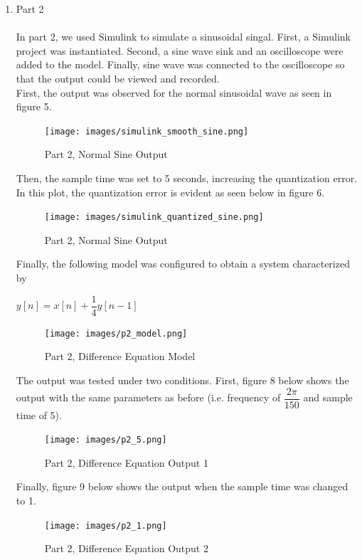\documentclass{article}
\begin{document}
\begin{enumerate}
\item Part 2 \\ \\
In part 2, we used Simulink to simulate a sinusoidal singal. First, a Simulink project was instantiated. Second, a sine wave sink and an oscilloscope were added to the model.  Finally, sine wave was connected to the oscilloscope so that the output could be viewed and recorded. \\
First, the output was observed for the normal sinusoidal wave as seen in figure 5.
\begin{figure}[H]
    \begin{center}
        \texttt{[image: images/simulink\_smooth\_sine.png]}
            \caption{Part 2, Normal Sine Output}
        \end{center}
    \end{figure}
Then, the sample time was set to 5 seconds, increasing the quantization error. In this plot, the quantization error is evident as seen below in figure 6.
\begin{figure}[H]
    \begin{center}
        \texttt{[image: images/simulink\_quantized\_sine.png]}
            \caption{Part 2, Normal Sine Output}
        \end{center}
    \end{figure}

Finally, the following model was configured to obtain a system characterized by
\begin{center}
    $y[n]=x[n]+\dfrac{1}{4}y[n-1]$
\end{center}
\begin{figure}[H]
    \begin{center}
        \texttt{[image: images/p2\_model.png]}
            \caption{Part 2, Difference Equation Model}
        \end{center}
    \end{figure}
The output was tested under two conditions. First, figure 8 below shows the output with the same parameters as before (i.e. frequency of $\dfrac{2\pi}{150}$ and sample time of 5).
\begin{figure}[H]
    \begin{center}
        \texttt{[image: images/p2\_5.png]}
            \caption{Part 2, Difference Equation Output 1}
        \end{center}
    \end{figure}
Finally, figure 9 below shows the output when the sample time was changed to 1.
\begin{figure}[H]
    \begin{center}
        \texttt{[image: images/p2\_1.png]}
            \caption{Part 2, Difference Equation Output 2}
        \end{center}
    \end{figure}
\end{enumerate}
\end{document}
